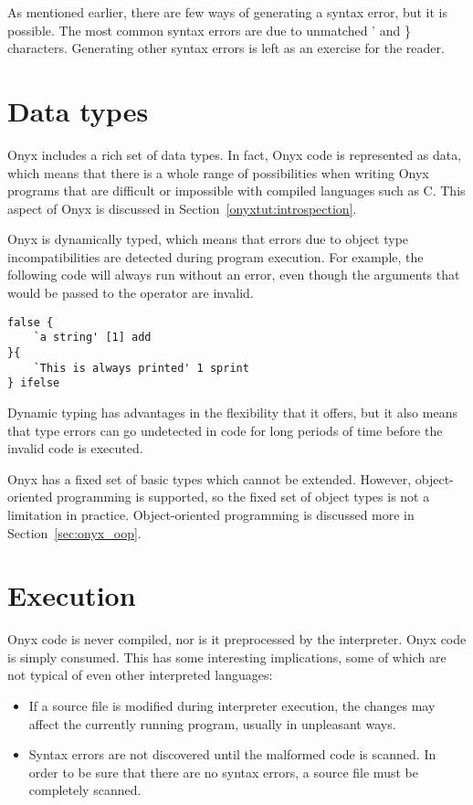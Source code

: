 As mentioned earlier, there are few ways of generating a syntax error, but it is
possible.  The most common syntax errors are due to unmatched ' and \}
characters.  Generating other syntax errors is left as an exercise for the
reader.

\section{Data types}

Onyx includes a rich set of data types.  In fact, Onyx code is represented as
data, which means that there is a whole range of possibilities when writing Onyx
programs that are difficult or impossible with compiled languages such as C.
This aspect of Onyx is discussed in Section~\ref{onyxtut:introspection}.

Onyx is dynamically typed, which means that errors due to object type
incompatibilities are detected during program execution.  For example, the
following code will always run without an error, even though the arguments that
would be passed to the  operator are
invalid.

\begin{verbatim}
false {
    `a string' [1] add
}{
    `This is always printed' 1 sprint
} ifelse
\end{verbatim}

Dynamic typing has advantages in the flexibility that it offers, but it also
means that type errors can go undetected in code for long periods of time before
the invalid code is executed.

Onyx has a fixed set of basic types which cannot be extended.  However,
object-oriented programming is supported, so the fixed set of object types is
not a limitation in practice.  Object-oriented programming is discussed more in
Section~\ref{sec:onyx_oop}.

\section{Execution}

Onyx code is never compiled, nor is it preprocessed by the interpreter.  Onyx
code is simply consumed.  This has some interesting implications, some of which
are not typical of even other interpreted languages:

\begin{itemize}
\item{If a source file is modified during interpreter execution, the changes may
affect the currently running program, usually in unpleasant ways.}
\item{Syntax errors are not discovered until the malformed code is scanned.  In
order to be sure that there are no syntax errors, a source file must be
completely scanned.}
\end{itemize}

